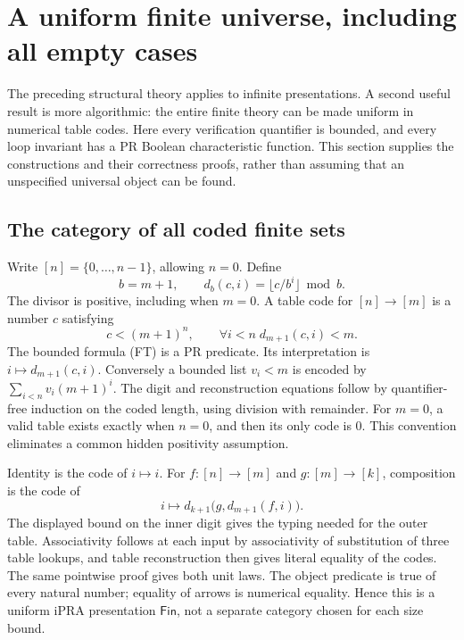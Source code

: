 \section{A uniform finite universe, including all empty cases}\label{sec:finite}

The preceding structural theory applies to infinite presentations. A second
useful result is more algorithmic: the entire finite theory can be made
uniform in numerical table codes. Here every verification quantifier is
bounded, and every loop invariant has a PR Boolean characteristic function.
This section supplies the constructions and their correctness proofs, rather
than assuming that an unspecified universal object can be found.

\subsection{The category of all coded finite sets}
Write $[n]=\{0,\ldots,n-1\}$, allowing $n=0$. Define
\[
 b=m+1,\qquad d_b(c,i)=\bigl\lfloor c/b^i\bigr\rfloor\bmod b.
\]
The divisor is positive, including when $m=0$. A table code for $[n]\to[m]$
is a number $c$ satisfying
\[
 c<(m+1)^n,\qquad\forall i<n\; d_{m+1}(c,i)<m.                 \tag{FT}
\]
The bounded formula (FT) is a PR predicate. Its interpretation is
$i\mapsto d_{m+1}(c,i)$. Conversely a bounded list $v_i<m$ is encoded by
$\sum_{i<n}v_i(m+1)^i$. The digit and reconstruction equations follow by
quantifier-free induction on the coded length, using division with remainder.
For $m=0$, a valid table exists exactly when $n=0$, and then its only code
is $0$. This convention eliminates a common hidden positivity assumption.

Identity is the code of $i\mapsto i$. For $f:[n]\to[m]$ and $g:[m]\to[k]$,
composition is the code of
\[
 i\longmapsto d_{k+1}\bigl(g,d_{m+1}(f,i)\bigr).
\]
The displayed bound on the inner digit gives the typing needed for the
outer table. Associativity follows at each input by associativity of
substitution of three table lookups, and table reconstruction then gives
literal equality of the codes. The same pointwise proof gives both unit
laws. The object predicate is true of every natural number; equality of
arrows is numerical equality. Hence this is a uniform iPRA presentation
$\mathsf{Fin}$, not a separate category chosen for each size bound.

